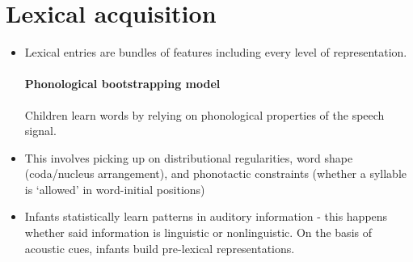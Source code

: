 \documentclass{article}
\begin{document}
\section{Lexical acquisition}
\begin{itemize}
    \item Lexical entries are bundles of features including every level of representation.
    \paragraph{Phonological bootstrapping model} Children learn words by relying on phonological properties of the speech signal.
    \item This involves picking up on distributional regularities, word shape (coda/nucleus arrangement), and phonotactic constraints (whether a syllable is `allowed' in word-initial positions)
    \item Infants statistically learn patterns in auditory information - this happens whether said information is linguistic or nonlinguistic. On the basis of acoustic cues, infants build pre-lexical representations.

\end{itemize}
\end{document}
